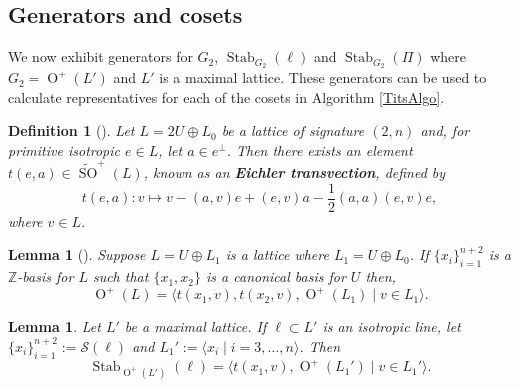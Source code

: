 \documentclass[12pt, a4paper]{article}
\newtheorem{lemma}[theorem]{Lemma}
\newtheorem{defn}[theorem]{Definition}
\newcommand{\ZZ}{\mathbb{Z}}
\newcommand{\la}{\langle}
\newcommand{\ra}{\rangle}
\newcommand{\beq}{\begin{equation*}}
\newcommand{\eeq}{\end{equation*}}
\newcommand{\Sc}{\mathcal{S}}
\newcommand{\opn}{\operatorname}
\newcommand{\op}{\oplus}
\newcommand{\old}{\opn{O}^+(L')}
\begin{document}
\subsection{Generators and cosets}
We now exhibit generators for $G_2$, $\opn{Stab}_{G_2}(\ell)$ and $\opn{Stab}_{G_2}(\Pi)$ where $G_2 = \opn{O}^+(L')$ and $L'$ is a maximal lattice.
These generators can be used to calculate representatives for each of the cosets in Algorithm \ref{TitsAlgo}. 
\begin{defn}[{\hspace{1sp}\cite{Eichler, abelianisation}}]
  Let $L=2U \op L_0$ be a lattice of signature $(2,n)$ and, for primitive isotropic $e \in L$, let $a \in e^{\perp}$.
  Then there exists an element $t(e,a) \in \widetilde{\opn{SO}}^+(L)$, known as an \textbf{Eichler transvection}, defined by
  \begin{equation}\label{eichlerdefeq}
  t(e,a): v \mapsto v - (a,v)e + (e,v)a - \frac{1}{2}(a,a)(e,v)e,
  \end{equation}
where $v \in L$.
\end{defn}
\begin{lemma}[{\hspace{1sp}\cite[Proposition 3.3]{abelianisation}}]\label{2ULgensLemma}
  Suppose $L=U \op L_1$ is a lattice where $L_1=U \op L_0$.
  If $\{x_i\}_{i=1}^{n+2}$ is a $\ZZ$-basis for $L$ such that   $\{x_1, x_2\}$ is a canonical basis for $U$ 
  then, 
    \beq
    \opn{O}^+(L) = \la t(x_1, v), t(x_2, v), \opn{O}^+(L_1) \mid v \in L_1 \ra.  
    \eeq
\end{lemma}
\begin{lemma}\label{ParaDecompLemma}
  Let $L'$ be a maximal lattice.
  If $\ell \subset L'$ is an isotropic line, let $\{x_i\}_{i=1}^{n+2}:=\Sc(\ell)$ and $L_1':=\la x_i \mid i=3, \ldots, n \ra$.
  Then 
  \beq
  \opn{Stab}_{\old}(\ell) =
  \la t(x_1, v), \opn{O}^+(L_1') \mid v \in L_1' \ra.
  \eeq
\end{lemma}
\end{document}
